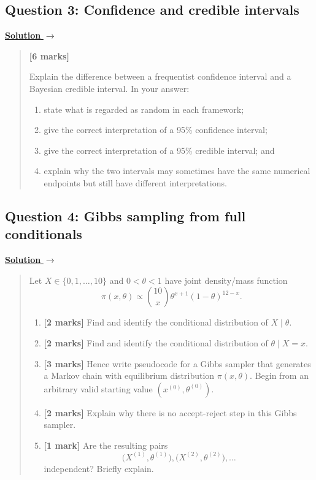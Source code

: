 \documentclass[11pt,a4paper]{article}
\newcommand{\given}{\mathrel{|}}
\newenvironment{examquestion}[2]
  {\subsection{#1}\label{question:\arabic{subsection}}\label{#2}%
   \noindent\hyperref[answer:\arabic{subsection}]{\textbf{Solution} $\rightarrow$}%
   \begin{quote}\color{statgrey}}
  {\end{quote}}
\begin{document}
\clearpage

\begin{examquestion}{Question 3: Confidence and credible intervals}{question:practice-confidence-and-credible-intervals}
\textbf{[6 marks]}

Explain the difference between a frequentist confidence interval and a
Bayesian credible interval. In your answer:
\begin{enumerate}[label=\arabic*.]
  \item state what is regarded as random in each framework;
  \item give the correct interpretation of a 95\% confidence interval;
  \item give the correct interpretation of a 95\% credible interval; and
  \item explain why the two intervals may sometimes have the same numerical
        endpoints but still have different interpretations.
\end{enumerate}
\end{examquestion}

\clearpage

\begin{examquestion}{Question 4: Gibbs sampling from full conditionals}{question:practice-gibbs-sampling-from-full-conditionals}
Let $X\in\{0,1,\ldots,10\}$ and $0<\theta<1$ have joint density/mass
function
\[
  \pi(x,\theta)
  \propto
  \binom{10}{x}\theta^{x+1}(1-\theta)^{12-x}.
\]

\begin{enumerate}[label=(\alph*)]
  \item \textbf{[2 marks]} Find and identify the conditional distribution of
        $X\given\theta$.

  \item \textbf{[2 marks]} Find and identify the conditional distribution of
        $\theta\given X=x$.

  \item \textbf{[3 marks]} Hence write pseudocode for a Gibbs sampler that
        generates a Markov chain with equilibrium distribution
        $\pi(x,\theta)$. Begin from an arbitrary valid starting value
        $(x^{(0)},\theta^{(0)})$.

  \item \textbf{[2 marks]} Explain why there is no accept-reject step in this
        Gibbs sampler.

  \item \textbf{[1 mark]} Are the resulting pairs
        \[
          \bigl(X^{(1)},\theta^{(1)}\bigr),
          \bigl(X^{(2)},\theta^{(2)}\bigr),\ldots
        \]
        independent? Briefly explain.
\end{enumerate}
\end{examquestion}
\end{document}
